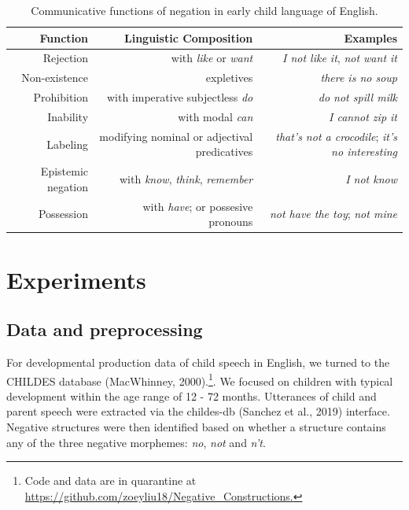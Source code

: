 \documentclass[10pt, letterpaper]{article}
\begin{document}
\begin{table}[h]
\small
\centering
\begin{tabular}{rrr}
  \hline
 \textbf{Function} & \textbf{Linguistic Composition} & \textbf{Examples} \\
  \hline
Rejection & with \textit{like} or \textit{want} & \textit{I not like it}, \textit{not want it}  \\
Non-existence & expletives & \textit{there is no soup} \\
Prohibition & with imperative subjectless \textit{do} & \textit{do not spill milk} \\
Inability & with modal \textit{can} & \textit{I cannot zip it} \\
Labeling & modifying nominal or adjectival predicatives & \textit{that's not a crocodile}; \textit{it's no interesting} \\
Epistemic negation & with \textit{know}, \textit{think}, \textit{remember}  & \textit{I not know} \\
Possession & with \textit{have}; or possesive pronouns & \textit{not have the toy}; \textit{not mine} \\
   \hline
\end{tabular}
\caption{Communicative functions of negation in early child language of English.}
\end{table}

\hypertarget{experiments}{%
\section{Experiments}\label{experiments}}

\hypertarget{data-and-preprocessing}{%
\subsection{Data and preprocessing}\label{data-and-preprocessing}}

For developmental production data of child speech in English, we turned
to the CHILDES database (MacWhinney,
2000).\footnote{Code and data are in quarantine at \url{https://github.com/zoeyliu18/Negative_Constructions.}}.
We focused on children with typical development within the age range of
12 - 72 months. Utterances of child and parent speech were extracted via
the childes-db (Sanchez et al., 2019) interface. Negative structures
were then identified based on whether a structure contains any of the
three negative morphemes: \emph{no}, \emph{not} and \emph{n't}.
\end{document}
